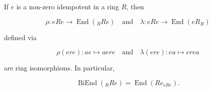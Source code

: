 If $e$ is a non-zero idempotent in a ring $R$, then

$$\rho: eRe \rightarrow \operatorname{End}(_R Re) \quad \text{and} \quad \lambda: eRe \rightarrow \operatorname{End}(eR_R)$$

defined via

$$\rho(ere): ae \mapsto aere \quad \text{and} \quad \lambda(ere): ea \mapsto erea$$

are ring isomorphisms. In particular,

$$\operatorname{BiEnd}(_R Re) = \operatorname{End}(Re_{eRe}).$$
